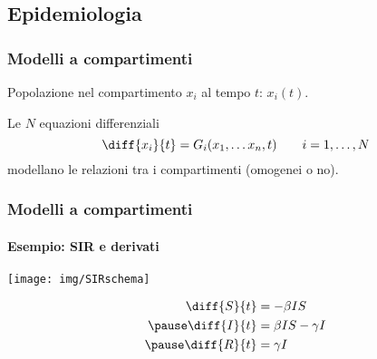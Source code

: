 \documentclass[]{beamer}
\begin{document}
\subsection{Epidemiologia}


\begin{frame}
    \frametitle{Modelli a compartimenti}

    Popolazione nel compartimento $x_i$ al tempo $t$: $x_i(t)$.

    \pause
    Le $N$ equazioni differenziali
    $$ \diff{x_i}{t} = G_i (x_1, \dots x_n, t) \qquad i=1, \dots, N$$
    modellano le relazioni tra i compartimenti (omogenei o no).
\end{frame}


\begin{frame}
    \frametitle{Modelli a compartimenti}
    \framesubtitle{Esempio: SIR e derivati}

    \begin{center}
        \texttt{[image: img/SIRschema]}
    \end{center}

    \pause
    \begin{align}
    \diff{S}{t} &= - \beta I S \\
    \pause
    \diff{I}{t} &= \beta I S - \gamma I \\
    \pause
    \diff{R}{t} &= \gamma I
\end{align}

\end{frame}
\end{document}
